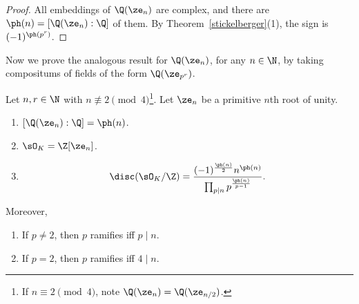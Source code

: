 \begin{proof}
All embeddings of $\Q(\ze_n)$ are complex, and there are $\ph(n)=[\Q(\ze_n):\Q]$ of them. By Theorem~\ref{stickelberger}(1), the sign is $(-1)^{\ph(p^r)}$.
\end{proof}
Now we prove the analogous result for $\Q(\ze_{n})$, for any $n\in\N$, by taking compositums of fields of the form $\Q(\ze_{p^r})$.
\begin{thm}
Let $n,r\in\N$ with $n\nequiv 2\pmod 4$\footnote{If $n\equiv 2\pmod{4}$, note $\Q(\ze_n)=\Q(\ze_{n/2})$.}. Let $\ze_n$ be a primitive $n$th root of unity.
\begin{enumerate}
\item $[\Q(\ze_n):\Q]=\ph(n)$.
\item $\sO_K=\Z[\ze_{n}]$.
\item 
\[
\disc(\sO_K/\Z)=\frac{(-1)^{\frac{\ph(n)}2}n^{\ph(n)}}{\prod_{p\mid n} p^{\frac{\ph(n)}{p-1}}}.
\]
\end{enumerate}
Moreover,
\begin{enumerate}
\item If $p\ne 2$, then $p$ ramifies iff $p\mid n$.
\item If $p=2$, then $p$ ramifies iff $4\mid n$.
\end{enumerate}
\end{thm}
